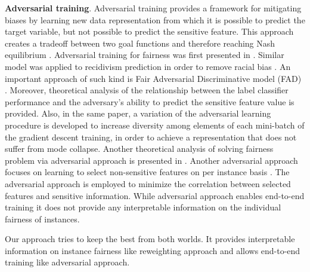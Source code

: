 \documentclass[preprint,12pt]{elsarticle}
\begin{document}
\textbf{Adversarial training}. Adversarial training provides a framework for mitigating biases by learning new data representation from which it is possible to predict the target variable, but not possible to predict the sensitive feature. This approach creates a tradeoff between two goal functions and therefore reaching Nash equilibrium \cite{goodfellow2014generative}.
Adversarial training for fairness was first presented in \cite{zhang2018mitigating}. Similar model was applied to recidivism prediction in order to remove racial bias \cite{wadsworth2018achieving}.
An important approach of such kind is Fair Adversarial Discriminative model (FAD) \cite{adel2019one}. Moreover, theoretical analysis of the relationship between the label classifier performance and the adversary’s ability to predict the sensitive feature value is provided. Also, in the same paper, a variation of the adversarial learning procedure is developed to increase diversity among elements of each mini-batch of the gradient descent training, in order to achieve a representation that does not suffer from mode collapse.
Another theoretical analysis of solving fairness problem via adversarial approach is presented in \cite{madras2018learning}.
Another adversarial approach focuses on learning to select non-sensitive features on per instance basis \cite{wang2019approaching}. The adversarial approach is employed to minimize the correlation between selected features and sensitive information. While adversarial approach enables end-to-end training it does not provide any interpretable information on the individual fairness of instances.

\vspace{2mm}
Our approach tries to keep the best from both worlds. It provides interpretable information on instance fairness like reweighting approach and allows end-to-end training like adversarial approach.
\end{document}
